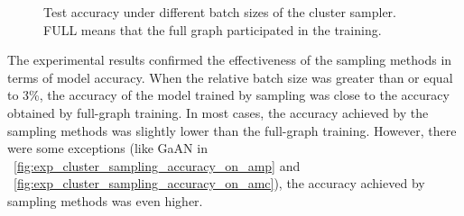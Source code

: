 \begin{figure}[H]
    \centering
    \caption{Test accuracy under different batch sizes of the cluster sampler. FULL means that the full graph participated in the training.}
    \label{fig:exp_sampling_relative_batch_size_accuracy_cluster}
\end{figure}

The experimental results confirmed the effectiveness of the sampling methods in terms of model accuracy.
%
When the relative batch size was greater than or equal to 3\%, the accuracy of the model trained by sampling was close to the accuracy obtained by full-graph training.
%
In most cases, the accuracy achieved by the sampling methods was slightly lower than the full-graph training.
%
However, there were some exceptions (like GaAN in \figurename~\ref{fig:exp_cluster_sampling_accuracy_on_amp} and \figurename~\ref{fig:exp_cluster_sampling_accuracy_on_amc}), the accuracy achieved by sampling methods was even higher.

